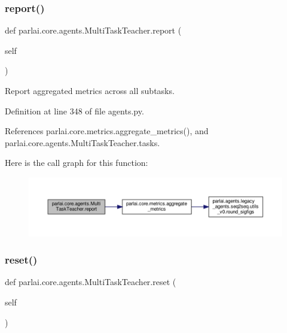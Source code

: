 \subsubsection{\texorpdfstring{report()}{report()}}
{\footnotesize\ttfamily def parlai.\+core.\+agents.\+Multi\+Task\+Teacher.\+report (\begin{DoxyParamCaption}\item[{}]{self }\end{DoxyParamCaption})}

\begin{DoxyVerb}Report aggregated metrics across all subtasks.\end{DoxyVerb}
 

Definition at line 348 of file agents.\+py.



References parlai.\+core.\+metrics.\+aggregate\+\_\+metrics(), and parlai.\+core.\+agents.\+Multi\+Task\+Teacher.\+tasks.

Here is the call graph for this function\+:
\nopagebreak
\begin{figure}[H]
\begin{center}
\leavevmode
\includegraphics[width=350pt]{classparlai_1_1core_1_1agents_1_1MultiTaskTeacher_ac93a499c6438ee1b57d0ad6a702851ae_cgraph}
\end{center}
\end{figure}
\mbox{\label{classparlai_1_1core_1_1agents_1_1MultiTaskTeacher_ae4eeda38c4164498018ee6515050ae43}} 
\subsubsection{\texorpdfstring{reset()}{reset()}}
{\footnotesize\ttfamily def parlai.\+core.\+agents.\+Multi\+Task\+Teacher.\+reset (\begin{DoxyParamCaption}\item[{}]{self }\end{DoxyParamCaption})}

